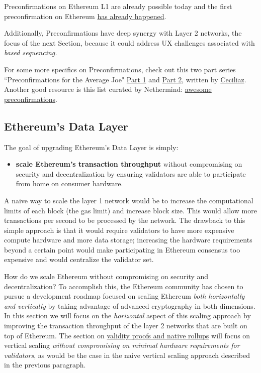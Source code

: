 \documentclass[12pt]{article}
\begin{document}
Preconfirmations on Ethereum L1 are already possible today and the first preconfirmation on Ethereum \href{https://x.com/drakefjustin/status/1857083454011101600?referrer=grok-com}{has already happened}.

Additionally, Preconfirmations have deep synergy with Layer 2 networks, the focus of the next Section, because it could address UX challenges associated with \textit{based sequencing.} 

For some more specifics on Preconfirmations, check out this two part series ``Preconfirmations for the Average Joe" \href{https://x.com/ceciliaz030/status/1875558701324759392}{Part 1} and \href{https://x.com/ceciliaz030/status/1890688136491278457}{Part 2}, written by \href{https://x.com/ceciliaz030}{Ceciliaz}. Another good resource is this list curated by Nethermind: \href{https://github.com/NethermindEth/awesome-preconfirmations}{awesome preconfirmations}. 

\subsection[\protect\textbf{\small Ethereum's Data Layer}]{Ethereum's Data Layer}
\label{Layer 2s}

The goal of upgrading Ethereum's Data Layer is simply:

\begin{itemize}
    \item \textbf{scale Ethereum's transaction throughput} without compromising on security and decentralization by ensuring validators are able to participate from home on consumer hardware. 
\end{itemize}

A naive way to scale the layer 1 network would be to increase the computational limits of each block (the gas limit) and increase block size. This would allow more transactions per second to be processed by the network. The drawback to this simple approach is that it would require validators to have more expensive compute hardware and more data storage; increasing the hardware requirements beyond a certain point would make participating in Ethereum consensus too expensive and would centralize the validator set. 

How do we scale Ethereum without compromising on security and decentralization? To accomplish this, the Ethereum community has chosen to pursue a development roadmap focused on scaling Ethereum \textit{both horizontally and vertically} by taking advantage of advanced cryptography in both dimensions. In this section we will focus on the \textit{horizontal} aspect of this scaling approach by improving the transaction throughput of the layer 2 networks that are built on top of Ethereum. The section on \hyperref[Execution Layer]{validity proofs and native rollups} will focus on vertical scaling \textit{without compromising on minimal hardware requirements for validators}, as would be the case in the naive vertical scaling approach described in the previous paragraph. 
\end{document}

